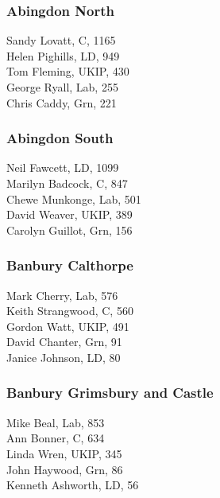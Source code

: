 \documentclass[a4paper,openany,10pt]{book}
\begin{document}
\subsubsection*{Abingdon North}



Sandy Lovatt, C, 1165\\
Helen Pighills, LD, 949\\
Tom Fleming, UKIP, 430\\
George Ryall, Lab, 255\\
Chris Caddy, Grn, 221\\


\subsubsection*{Abingdon South}



Neil Fawcett, LD, 1099\\
Marilyn Badcock, C, 847\\
Chewe Munkonge, Lab, 501\\
David Weaver, UKIP, 389\\
Carolyn Guillot, Grn, 156\\


\subsubsection*{Banbury Calthorpe}



Mark Cherry, Lab, 576\\
Keith Strangwood, C, 560\\
Gordon Watt, UKIP, 491\\
David Chanter, Grn, 91\\
Janice Johnson, LD, 80\\


\subsubsection*{Banbury Grimsbury and Castle}



Mike Beal, Lab, 853\\
Ann Bonner, C, 634\\
Linda Wren, UKIP, 345\\
John Haywood, Grn, 86\\
Kenneth Ashworth, LD, 56\\
\end{document}
